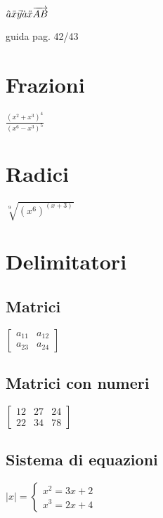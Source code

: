 \documentclass[a4paper]{article}
\begin{document}
$
\hat{a}\\
\bar{x}\\
\vec{y}\\
\dot{a}\\
\ddot{x}\\
\overrightarrow{AB}
$

guida pag. 42/43

\section{Frazioni}

$
\frac{(x^2+x^3)^4}{(x^6-x^3)^5}
$

\section{Radici}

$
\sqrt[9]{(x^6)^(x+3)}
$

\section{Delimitatori}

\subsection{Matrici}

$
\left[
\begin{array}{cc}
    a_{11} & a_{12} \\ a_{23} & a_{24}
\end{array}
\right]
$

\subsection{Matrici con numeri}

$
\left[
\begin{array}{ccc} %
    12 & 27 & 24 \\ 22 & 34 & 78
\end{array}
\right]
$

\subsection{Sistema di equazioni}

$
|x| =
\left\{
\begin{array}{r}
    x^2 = 3x + 2 \\
    x^3 = 2x +4
\end{array}
\right.
$
\end{document}

